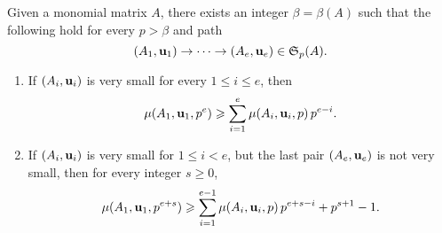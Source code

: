 \documentclass[11pt]{amsart}
\begin{document}
%
% 
\begin{corollary}\label{cor: iterated lifting}
Given a monomial matrix $A$, there exists an integer $\beta = \beta(A)$ such that the following hold for every $p > \beta$ and path \[ (A_1, \mathbf{u}_1) \to \cdots \to (A_e, \mathbf{u}_e)  \in \mathfrak{S}_p(A).\]  
\begin{enumerate}
\item If $(A_i, \mathbf{u}_i)$ is very small for every $1 \leq i \leq e$, then \[ \mu(A_1, \mathbf{u}_1, p^e) \geqslant \sum_{i=1}^e \mu(A_i, \mathbf{u}_i, p) \, p^{e-i}.\] 
\item If $(A_i, \mathbf{u}_i)$ is very small for $1 \leq i < e$, but the last pair $(A_e, \mathbf{u}_e)$ is not very small, then for every integer $s \geq 0$, 
 \[ \mu(A_1, \mathbf{u}_1, p^{e+s}) \geqslant \sum_{i=1}^{e-1} \mu(A_i, \mathbf{u}_i, p) \, p^{e+s-i} + p^{s+1}-1. \]
\end{enumerate}
\end{corollary}
\end{document}
